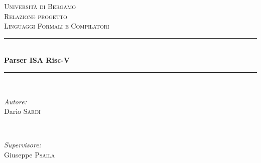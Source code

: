 \begin{titlepage}

\newcommand{\HRule}{\rule{\linewidth}{0.5mm}} %

\center %
 

\textsc{\LARGE Università di Bergamo}\\[1.5cm] %
\textsc{\Large Relazione progetto}\\[0.5cm] %
\textsc{\large Linguaggi Formali e Compilatori}\\[0.5cm] %


\HRule \\[0.4cm]
{ \huge \bfseries Parser ISA Risc-V}\\[0.4cm] %
\HRule \\[1.5cm]
 

\begin{minipage}{0.4\textwidth}
\begin{flushleft} \large
\emph{Autore:}\\
Dario \textsc{Sardi} %
\end{flushleft}
\end{minipage}
~
\begin{minipage}{0.4\textwidth}
\begin{flushright} \large
\emph{Supervisore:} \\
Giuseppe \textsc{Psaila} %
\end{flushright}
\end{minipage}\\[2cm]



\end{titlepage}
